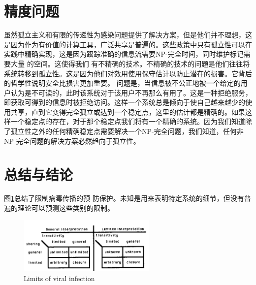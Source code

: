 \section{精度问题}

虽然孤立主义和有限的传递性为感染问题提供了解决方案，但是他们并不理想，这是因为作为有价值的计算工具，广泛共享是普遍的。这些政策中只有孤立性可以在实践中精确实现，这是因为跟踪准确的信息流需要NP-完全时间，同时维护标记需要大量
的空间。这使得我们
有不精确的技术。不精确的技术的问题是他们往往将系统转移到孤立性。这是因为他们对效用使用保守估计以防止潜在的损害。它背后的哲学性说明安全比损害更加重要。
问题是，当信息被不公正地被一个给定的用户认为是不可读的，此时该系统对于该用户不再那么有用了。这是一种拒绝服务，即获取可得到的信息时被拒绝访问。这样一个系统总是倾向于使自己越来越少的使用共享，直到它变得完全孤立或达到一个稳定点，这里的估计都是精确的。如果这样一个稳定点的存在，对于那个稳定点我们将有一个精确的系统。因为我们知道除了孤立性之外的任何精确稳定点需要解决一个NP-完全问题，我们知道，任何非NP-完全问题的解决方案必然趋向于孤立性。

\section{总结与结论}

图\ref{fig5}总结了限制病毒传播的预
防保护。未知是用来表明特定系统的细节，但没有普遍的理论可以预测这些类别的限制。

\begin{figure}[h!]
    \centering
    \includegraphics[width=0.60\textwidth]{figure/fig5.png}
    \caption{Limits of viral infection} 
    \label{fig5}
\end{figure} 








